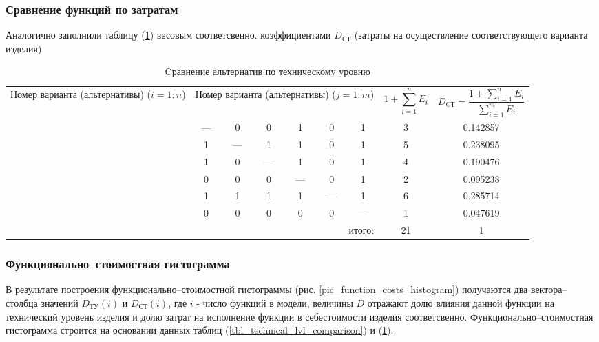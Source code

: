 \subsubsection{Сравнение функций по затратам}
Аналогично заполнили таблицу (\ref{tbl_costs_lvl_comparison}) весовым соответсвенно.
коэффициентами $D_\text{СТ}$ (затраты на осуществление соответствующего варианта
изделия).
\begin{table}[ht!]
    \centering
    \begin{tabular}{|c|c|c|c|c|c|c|c|c|}
        \hline
        \multirow{2}{2.4cm}{
            \centering
            Номер варианта (альтернативы) ($i = \overline{1:n}$)
        } &
        \multicolumn{6}{c|}{
            \parbox[t]{2.4cm}{
                \centering
                Номер варианта (альтернативы) ($j = \overline{1:m}$)
            }
        } &
        \multirow{2}{1.7cm}[0pt]{
            \centering
            $$1 + \sum_{i=1}^n E_i$$
        } &
        \multirow{2}{3.2cm}{
            \centering
            $$ D_\text{CТ} = \frac{1 + \sum_{i=1}^n E_i}{\sum_{i=1}^m E_i}$$
        } \\
        &
        \centering{1} &
        \centering{2} &
        \centering{3} &
        \centering{4} &
        \centering{5} &
        \centering{6} & & \\
        \hline \hline
        \centering{1} &---& 0 & 0 & 1 & 0 & 1 & 3 & 0.142857 \\ \hline
        \centering{2} & 1 &---& 1 & 1 & 0 & 1 & 5 & 0.238095 \\ \hline
        \centering{3} & 1 & 0 &---& 1 & 0 & 1 & 4 & 0.190476 \\ \hline
        \centering{4} & 0 & 0 & 0 &---& 0 & 1 & 2 & 0.095238 \\ \hline
        \centering{5} & 1 & 1 & 1 & 1 &---& 1 & 6 & 0.285714 \\ \hline
        \centering{6} & 0 & 0 & 0 & 0 & 0 &---& 1 & 0.047619 \\ \hline
        \hline
        \multicolumn{7}{|r|}{итого:} & 21 & 1 \\
        \hline
    \end{tabular}
    \caption{Cравнение альтернатив по техническому уровню}
    \label{tbl_costs_lvl_comparison}
\end{table}


\subsubsection{Функционально--стоимостная гистограмма}
В результате построения функционально--стоимостной гистограммы
(рис. \ref{pic_function_costs_histogram}) получаются два вектора--столбца
значений $D_\text{ТУ}(i)$ и $D_\text{СТ}(i)$, где $i$ - число функций в модели,
величины $D$ отражают долю влияния данной функции на технический уровень изделия
и долю затрат на исполнение функции в себестоимости изделия соответсвенно.
Функционально--стоимостная гистограмма строится на основании данных таблиц
(\ref{tbl_technical_lvl_comparison}) и (\ref{tbl_costs_lvl_comparison}).

